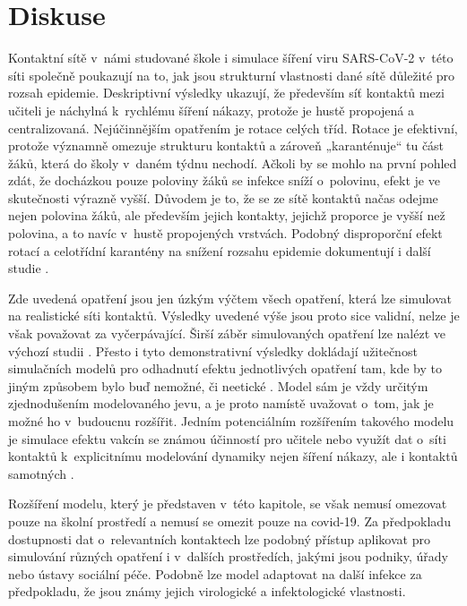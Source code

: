\section*{Diskuse} 
Kontaktní sítě v~námi studované škole i simulace šíření viru SARS-CoV-2 v~této síti společně poukazují na to, jak jsou strukturní vlastnosti dané sítě důležité pro rozsah epidemie. Deskriptivní výsledky ukazují, že především síť kontaktů mezi učiteli je náchylná k~rychlému šíření nákazy, protože je hustě propojená a centralizovaná. Nejúčinnějším opatřením je rotace celých tříd. Rotace je efektivní, protože významně omezuje strukturu kontaktů a zároveň „karanténuje“ tu část žáků, která do školy v~daném týdnu nechodí. Ačkoli by se mohlo na první pohled zdát, že docházkou pouze poloviny žáků se infekce sníží o~polovinu, efekt je ve skutečnosti výrazně vyšší. Důvodem je to, že se ze sítě kontaktů načas odejme nejen polovina žáků, ale především jejich kontakty, jejichž proporce je vyšší než polovina, a to navíc v~hustě propojených vrstvách. Podobný disproporční efekt rotací a celotřídní karantény na snížení rozsahu epidemie dokumentují i další studie \cite{gemmetto2014mitigation, mcgee2021model}. 

Zde uvedená opatření jsou jen úzkým výčtem všech opatření, která lze simulovat na realistické síti kontaktů. Výsledky uvedené výše jsou proto sice validní, nelze je však považovat za vyčerpávající. Širší záběr simulovaných opatření lze nalézt ve výchozí studii \cite{Brom2021.06.28.21259628}. Přesto i tyto demonstrativní výsledky dokládají užitečnost simulačních modelů pro odhadnutí efektu jednotlivých opatření tam, kde by to jiným způsobem bylo buď nemožné, či neetické \cite{squazzoni2020computational}. Model sám je vždy určitým zjednodušením modelovaného jevu, a je proto namístě uvažovat o~tom, jak je možné ho v~budoucnu rozšířit. Jedním potenciálním rozšířením takového modelu je simulace efektu vakcín se známou účinností pro učitele \cite{mcgee2021model} nebo využít dat o~síti kontaktů k~explicitnímu modelování dynamiky nejen šíření nákazy, ale i kontaktů samotných \cite{Rao_etal2021}.

Rozšíření modelu, který je představen v~této kapitole, se však nemusí omezovat pouze na školní prostředí a nemusí se omezit pouze na covid-19. Za předpokladu dostupnosti dat o~relevantních kontaktech lze podobný přístup aplikovat pro simulování různých opatření i v~dalších prostředích, jakými jsou podniky, úřady nebo ústavy sociální péče. Podobně lze model adaptovat na další infekce za předpokladu, že jsou známy jejich virologické a infektologické vlastnosti. 

